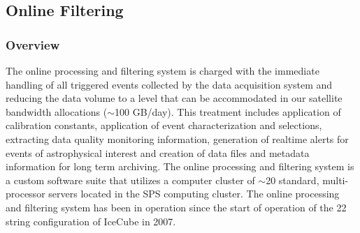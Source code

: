 

\subsection{\label{sect:online:filter}Online Filtering}

\subsubsection{Overview}
The online processing and filtering system is charged with the immediate handling of all triggered events collected by the data
acquisition system and reducing the data volume to a level that can be
accommodated in our satellite bandwidth allocations ($\sim$100 GB/day).
This treatment includes application of calibration constants, application of event characterization and selections,  
extracting data quality monitoring information, generation of realtime alerts for events of astrophysical interest
and creation of data files and metadata information for long term archiving.  The online processing and filtering system
is a custom software suite that utilizes a computer cluster of
$\sim$20 standard, multi-processor servers located in the SPS computing cluster.
The online processing and filtering system has been in operation since the
start of operation of the 22 string configuration of IceCube in 2007.

